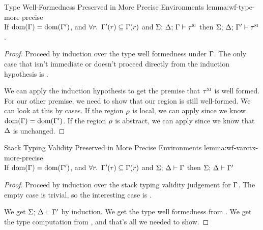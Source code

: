 \begin{oxlemma}{Type Well-Formedness Preserved in More Precise Environments}
  {lemma:wf-type-more-precise}\hfill\\
  If $\textrm{dom}(\Gamma) =
  \textrm{dom}(\Gamma^\prime)$, and $\forall r.$ $\Gamma^\prime(r)
  \subseteq \Gamma(r)$ and
  $\Sigma; \, \Delta; \, \Gamma \vdash \tau^\textsc{si}$
  then
  $\Sigma; \, \Delta; \, \Gamma^\prime \vdash \tau^\textsc{si}$.
\end{oxlemma}

\begin{proof}
  Proceed by induction over the type well formedness under $\Gamma$. The only
  case that isn't immediate or doesn't proceed directly from the induction
  hypothesis is .

  \vspace{1em}
  \noindent \framebox[\textwidth]{
    \figuresize
    \begin{mathpar}
      \VRef
    \end{mathpar}
  }
  \vspace{1em}

  We can apply the induction hypothesis to get the premise that $\tau^\textsc{xi}$ is
  well formed. For our other premise, we need to show that our region is still
  well-formed. We can look at this by cases. If the region $\rho$ is local,
  we can apply  since we know $\textrm{dom}(\Gamma) =
  \textrm{dom}(\Gamma^\prime)$. If the region $\rho$ is abstract, we can apply
   since we know that $\Delta$ is unchanged.
\end{proof}


\begin{oxlemma}{Stack Typing Validity Preserved in More Precise Environments}
  {lemma:wf-varctx-more-precise}\hfill\\
  If $\textrm{dom}(\Gamma) =
  \textrm{dom}(\Gamma^\prime)$, and $\forall r.$ $\Gamma^\prime(r)
  \subseteq \Gamma(r)$ and
  $\Sigma; \, \Delta \vdash \Gamma$
  then
  $\Sigma; \, \Delta \vdash \Gamma^\prime$
\end{oxlemma}

\begin{proof}
  Proceed by induction over the stack typing validity judgement for $\Gamma$.
  The empty case is trivial, so the interesting case is .

  \vspace{1em}
  \noindent \framebox[\textwidth]{
    \figuresize
    \begin{mathpar}
      \WFVarCtx
    \end{mathpar}
  }
  \vspace{1em}

  We get $\Sigma; \, \Delta \vdash \Gamma^\prime$ by
  induction. We get the type well formedness from
  . We get the type computation from
  , and that's all we needed to show.

\end{proof}

